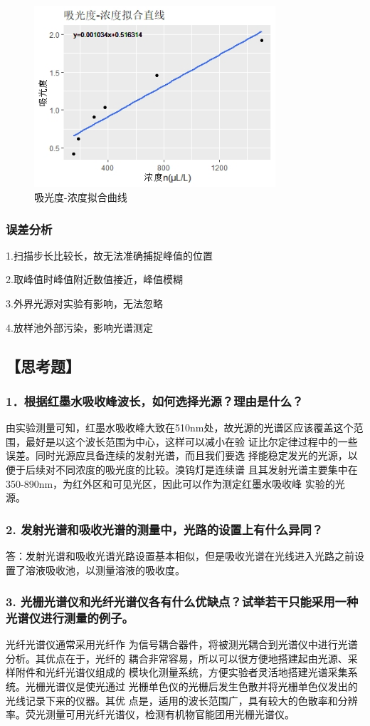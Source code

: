 \documentclass[12pt,a4paper,UTF8]{ctexart}
\begin{document}
\begin{figure}[htbp]
	\centering
	\includegraphics[width=0.8\textwidth]{img//Reg.jpeg}
	\caption{吸光度-浓度拟合曲线}
	\label{fig:2}
\end{figure}

\newpage
\subsubsection*{误差分析}
1.扫描步长比较长，故无法准确捕捉峰值的位置

2.取峰值时峰值附近数值接近，峰值模糊

3.外界光源对实验有影响，无法忽略

4.放样池外部污染，影响光谱测定

\subsection*{【思考题】}
\subsubsection*{1．根据红墨水吸收峰波长，如何选择光源？理由是什么？}
由实验测量可知，红墨水吸收峰大致在510nm处，故光源的光谱区应该覆盖这个范围，最好是以这个波长范围为中心，这样可以减小在验
证比尔定律过程中的一些误差。同时光源应具备连续的发射光谱，而且我们要选
择能稳定发光的光源，以便于后续对不同浓度的吸光度的比较。溴钨灯是连续谱
且其发射光谱主要集中在350-890nm，为红外区和可见光区，因此可以作为测定红墨水吸收峰
实验的光源。

\subsubsection*{2. 发射光谱和吸收光谱的测量中，光路的设置上有什么异同？}
答：发射光谱和吸收光谱光路设置基本相似，但是吸收光谱在光线进入光路之前设
置了溶液吸收池，以测量溶液的吸收度。

\subsubsection*{3. 光栅光谱仪和光纤光谱仪各有什么优缺点？试举若干只能采用一种光谱仪进行测量的例子。}
光纤光谱仪通常采用光纤作
为信号耦合器件，将被测光耦合到光谱仪中进行光谱分析。其优点在于，光纤的
耦合非常容易，所以可以很方便地搭建起由光源、采样附件和光纤光谱仪组成的
模块化测量系统，方便实验者灵活地搭建光谱采集系统。光栅光谱仪是使光通过
光栅单色仪的光栅后发生色散并将光栅单色仪发出的光线记录下来的仪器。其优
点是，适用的波长范围广，具有较大的色散率和分辨率。荧光测量可用光纤光谱仪，检测有机物官能团用光栅光谱仪。
\end{document}
